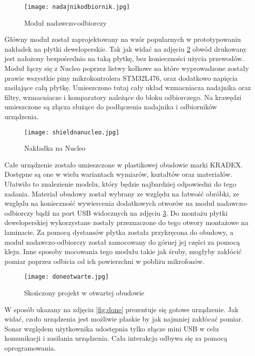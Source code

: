 \begin{figure}[ht!]
    \centering
    \texttt{[image: nadajnikodbiornik.jpg]}
    \caption{Moduł nadawczo-odbiorczy}
    \label{fig:nadajnikodbiornik}
\end{figure}

Główny moduł został zaprojektowany na wzór popularnych w prototypowaniu nakładek na płytki deweloperskie. 
Tak jak widać na zdjęciu \ref{fig:shieldnucleo} obwód drukowany jest nałożony bezpośrednio na taką płytkę, bez konieczności użycia przewodów.  
Moduł łączy się z Nucleo poprzez listwy kołkowe na które wyprowadzone zostały prawie wszystkie piny mikrokontrolera STM32L476, oraz dodatkowo napięcia zasilające całą płytkę.
Umieszczono tutaj cały układ wzmacniacza nadajnika oraz filtry, wzmacniacze i komparatory należące do bloku odbiorczego. 
Na krawędzi umieszczone są złącza służące do podłączenia nadajnika i odbiorników urządzenia.

\begin{figure}[ht!]
    \centering
    \texttt{[image: shieldnanucleo.jpg]}
    \caption{Nakładka na Nucleo}
    \label{fig:shieldnucleo}
\end{figure}

\clearpage
Całe urządzenie zostało umieszczone w plastikowej obudowie marki KRADEX. Dostępne są one w wielu wariantach wymiarów, 
kształtów oraz materiałów. Ułatwiło to znalezienie modelu, który będzie najbardziej odpowiedni do tego zadania. Materiał obudowy został wybrany ze względu na łatwość obróbki, 
ze względu na konieczność wywiercenia dodatkowych otworów na moduł nadawczo-odbiorczy bądź na port USB widocznych na zdjęciu \ref{fig:done_open}.
Do montażu płytki deweloperskiej wykorzystane zostały przeznaczone do tego otwory montażowe na laminacie. Za pomocą dystansów płytka została przykręcona do obudowy, 
a moduł nadawczo-odbiorczy został zamocowany do górnej jej części za pomocą kleju. 
Inne sposoby mocowania tego modułu takie jak śruby, mogłyby zakłócić pomiar poprzez odbicia od ich powierzchni w pobliżu mikrofonów. 

\begin{figure}[ht!]
    \centering
    \texttt{[image: doneotwarte.jpg]}
    \caption{Skończony projekt w otwartej obudowie}
    \label{fig:done_open}
\end{figure}

W sposób ukazany na zdjęciu \ref{fig:done} prezentuje się gotowe urządzenie. Jak widać, czoło urządzenia jest możliwie płaskie by jak najmniej zakłócać pomiar.
Sonar względem użytkownika udostępnia tylko złącze mini USB w celu komunikacji i zasilania urządzenia. Cała interakcja odbywa się za pomocą oprogramowania.


